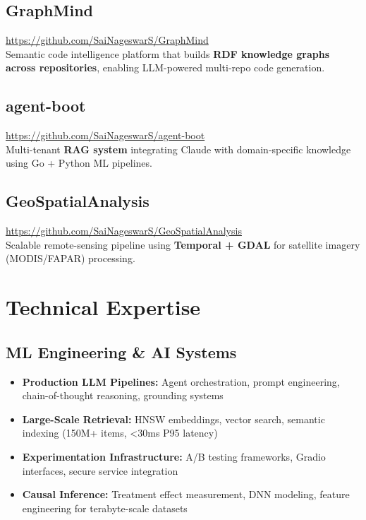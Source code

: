 \documentclass[11pt,letterpaper]{article}
\begin{document}
\subsection{GraphMind}
\href{https://github.com/SaiNageswarS/GraphMind}{https://github.com/SaiNageswarS/GraphMind} \\
Semantic code intelligence platform that builds \textbf{RDF knowledge graphs across repositories}, enabling LLM-powered multi-repo code generation.

\subsection{agent-boot}
\href{https://github.com/SaiNageswarS/agent-boot}{https://github.com/SaiNageswarS/agent-boot} \\
Multi-tenant \textbf{RAG system} integrating Claude with domain-specific knowledge using Go + Python ML pipelines.

\subsection{GeoSpatialAnalysis}
\href{https://github.com/SaiNageswarS/GeoSpatialAnalysis}{https://github.com/SaiNageswarS/GeoSpatialAnalysis} \\
Scalable remote-sensing pipeline using \textbf{Temporal + GDAL} for satellite imagery (MODIS/FAPAR) processing.

\section{Technical Expertise}

\subsection{ML Engineering \& AI Systems}
\begin{itemize}[leftmargin=*,noitemsep]
    \item \textbf{Production LLM Pipelines:} Agent orchestration, prompt engineering, chain-of-thought reasoning, grounding systems
    \item \textbf{Large-Scale Retrieval:} HNSW embeddings, vector search, semantic indexing (150M+ items, <30ms P95 latency)
    \item \textbf{Experimentation Infrastructure:} A/B testing frameworks, Gradio interfaces, secure service integration
    \item \textbf{Causal Inference:} Treatment effect measurement, DNN modeling, feature engineering for terabyte-scale datasets
\end{itemize}
\end{document}
